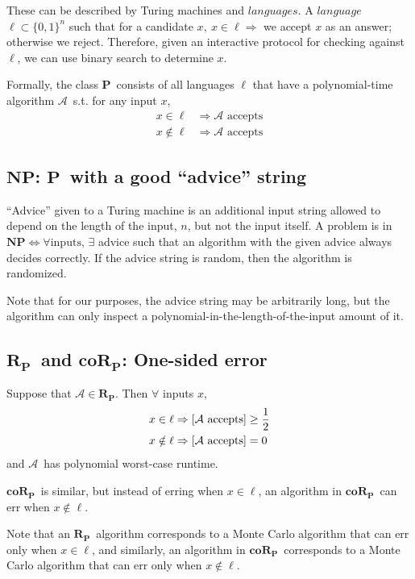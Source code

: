 \documentclass[11pt]{article}
\let\Pr\relax
\DeclareMathOperator*{\Pr}{\mathbb{P}}
\newcommand{\Pt}{\ensuremath{\mathbf{P}}}
\newcommand{\NP}{\ensuremath{\mathbf{NP}}}
\newcommand{\RP}{\ensuremath{\mathbf{R_{P}}}}
\newcommand{\coRP}{\ensuremath{\mathbf{coR_{P}}}}
\newcommand{\Alg}{\ensuremath{\mathcal{A}}}
\begin{document}
These can be described by Turing machines and $languages$. A $language$ $\ell \subset \{0,1\}^n$ such that for a candidate $x,\ x \in \ell \Rightarrow$ we accept $x$ as an answer; otherwise we reject.
Therefore, given an interactive protocol for checking against $\ell$, we can use binary search to determine $x$.

Formally, the class \Pt\ consists of all languages $\ell$ that have a polynomial-time algorithm \Alg\ s.t. for any input $x$, 
\begin{align*}
  x \in \ell &\Rightarrow \Alg \text{ accepts} \\
  x \notin \ell &\Rightarrow \Alg \text{ accepts}
\end{align*}

\subsection{\NP: \Pt\ with a good ``advice'' string}

``Advice'' given to a Turing machine is an additional input string allowed to depend on the length of the input, $n$, but not the input itself. A problem is in $\NP \Leftrightarrow \forall\text{inputs, }\exists$ advice such that an algorithm with the given advice always decides correctly. If the advice string is random, then the algorithm is randomized.

Note that for our purposes, the advice string may be arbitrarily long, but the algorithm can only inspect a polynomial-in-the-length-of-the-input amount of it.

\subsection{\RP\ and \coRP: One-sided error }

Suppose that $\Alg\in\RP$. Then $\forall$ inputs $x$,
\begin{align*}
  x \in \ell &\Rightarrow \Pr[\Alg \text{ accepts}] \geq \frac{1}{2} \\
  x \notin \ell &\Rightarrow \Pr[\Alg \text{ accepts}] = 0
\end{align*}
and \Alg\ has polynomial worst-case runtime.

\coRP\ is similar, but instead of erring when $x\in\ell$, an algorithm in \coRP\ can err when $x\notin\ell$.

Note that an \RP\ algorithm corresponds to a Monte Carlo algorithm that can err only when $x \in \ell$, and similarly, an algorithm in \coRP\ corresponds to a Monte Carlo algorithm that can err only when $x \notin \ell$. 
\end{document}
